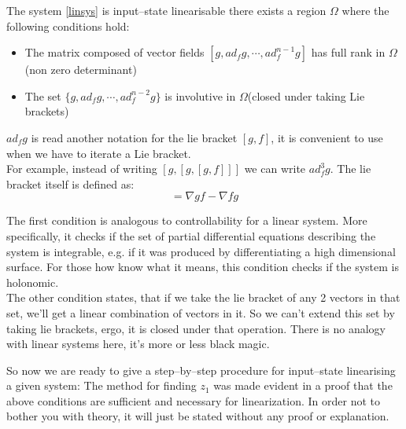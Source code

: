 {
    The system \ref{linsys} is input--state linearisable there exists a region $\Omega$ where the following conditions hold:
     \begin{itemize}
     \item The matrix composed of vector fields $[g, ad_fg,\cdots ,ad_f^{n-1}g]$ has full rank in $\Omega$(non zero determinant)
     \item  The set $\{g, ad_fg,\cdots ,ad_f^{n-2}g\}$ is involutive in $\Omega$(closed under taking Lie brackets)
    \end{itemize}
    \nt
    {
        $ad_fg$ is read another notation for the lie bracket $[g,f]$, it is convenient to use when we have to iterate a Lie bracket. \\
        For example, instead of writing  $[g,[g,[g,f]]]$ we can write  $ad_f^{3}g$. The lie bracket itself is defined as:
        \begin{equation}
            [f,g] = \nabla g f - \nabla f g
        \end{equation}

    }
    The first condition is analogous to controllability for a linear system. More specifically, it checks if the set of partial differential equations describing
    the system is integrable, e.g. if it was produced by differentiating a high dimensional surface. For those how know what it means, this condition checks if the
    system is holonomic.\\
    The other condition states, that if we take the lie bracket of any 2 vectors in that set, we'll get a linear combination of vectors in it. So we can't extend
    this set by taking lie brackets, ergo, it is closed under that operation. There is no analogy with linear systems here, it's more or less black magic.
}
So now we are ready to give a step--by--step procedure for input--state linearising a given system:
\nt
{
    The method for finding $z_1$ was made evident in a proof that the above conditions are sufficient and necessary for linearization. In order not to bother you with theory, it will just be stated without any proof or explanation.
}
